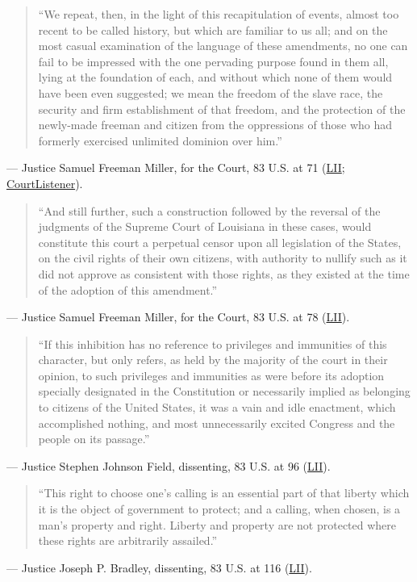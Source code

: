 \documentclass[12pt]{article}
\begin{document}
\begin{quote}
``We repeat, then, in the light of this recapitulation of events, almost too recent to be called history, but which are familiar to us all; and on the most casual examination of the language of these amendments, no one can fail to be impressed with the one pervading purpose found in them all, lying at the foundation of each, and without which none of them would have been even suggested; we mean the freedom of the slave race, the security and firm establishment of that freedom, and the protection of the newly-made freeman and citizen from the oppressions of those who had formerly exercised unlimited dominion over him.''
\end{quote}
\noindent --- Justice Samuel Freeman Miller, for the Court, 83 U.S. at 71 (\href{https://www.law.cornell.edu/supremecourt/text/83/36}{LII}; \href{https://www.courtlistener.com/opinion/88661/butchers-benevolent-assn-v-crescent-city-live-stock-landing/}{CourtListener}).

\begin{quote}
``And still further, such a construction followed by the reversal of the judgments of the Supreme Court of Louisiana in these cases, would constitute this court a perpetual censor upon all legislation of the States, on the civil rights of their own citizens, with authority to nullify such as it did not approve as consistent with those rights, as they existed at the time of the adoption of this amendment.''
\end{quote}
\noindent --- Justice Samuel Freeman Miller, for the Court, 83 U.S. at 78 (\href{https://www.law.cornell.edu/supremecourt/text/83/36}{LII}).

\begin{quote}
``If this inhibition has no reference to privileges and immunities of this character, but only refers, as held by the majority of the court in their opinion, to such privileges and immunities as were before its adoption specially designated in the Constitution or necessarily implied as belonging to citizens of the United States, it was a vain and idle enactment, which accomplished nothing, and most unnecessarily excited Congress and the people on its passage.''
\end{quote}
\noindent --- Justice Stephen Johnson Field, dissenting, 83 U.S. at 96 (\href{https://www.law.cornell.edu/supremecourt/text/83/36}{LII}).

\begin{quote}
``This right to choose one's calling is an essential part of that liberty which it is the object of government to protect; and a calling, when chosen, is a man's property and right. Liberty and property are not protected where these rights are arbitrarily assailed.''
\end{quote}
\noindent --- Justice Joseph P. Bradley, dissenting, 83 U.S. at 116 (\href{https://www.law.cornell.edu/supremecourt/text/83/36}{LII}).
\end{document}
